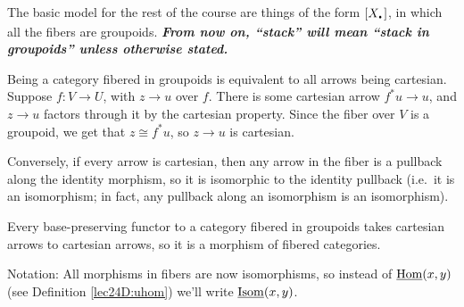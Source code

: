  The basic model for the rest of the course are things of the form $[X_\udot]$, in which
 all the fibers are groupoids. \textbf{\textit{From now on, ``stack'' will mean ``stack
 in groupoids'' unless otherwise stated.}}
 \begin{remark}
   Being a category fibered in groupoids is equivalent to all arrows being cartesian. Suppose
   $f:V\to U$, with $z\to u$ over $f$. There is some cartesian arrow $f^*u\to u$, and
   $z\to u$ factors through it by the cartesian property. Since the fiber over $V$ is a
   groupoid, we get that $z\cong f^*u$, so $z\to u$ is cartesian.

   Conversely, if every arrow is cartesian, then any arrow in the fiber is a pullback
   along the identity morphism, so it is isomorphic to the identity pullback (i.e.~it is
   an isomorphism; in fact, any pullback along an isomorphism is an isomorphism).
 \end{remark}
 \begin{remark}
   Every base-preserving functor to a category fibered in groupoids takes cartesian
   arrows to cartesian arrows, so it is a morphism of fibered categories.
 \end{remark}
 Notation: All morphisms in fibers are now isomorphisms, so instead of  $\operatorname{\underline{Hom}}(x,y)$
 (see Definition \ref{lec24D:uhom}) we'll write $\operatorname{\underline{Isom}}(x,y)$.
